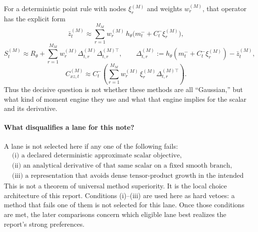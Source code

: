 \documentclass[11pt]{article}
\numberwithin{equation}{section}
\begin{document}
For a deterministic point rule with nodes \(\xi_r^{(M)}\) and weights
\(w_r^{(M)}\), that operator has the explicit form
\begin{equation}
  \bar z_t^{(M)}
  \approx
  \sum_{r=1}^{M_M} w_r^{(M)}
  \,h_\theta\!\bigl(m_t^-+C_t^-\xi_r^{(M)}\bigr),
  \label{eq:p32-selection-zbar}
\end{equation}
\begin{equation}
  S_t^{(M)}
  \approx
  R_\theta+
  \sum_{r=1}^{M_M} w_r^{(M)}
  \Delta_{t,r}^{(M)}\Delta_{t,r}^{(M)\top},
  \qquad
  \Delta_{t,r}^{(M)}:=h_\theta(m_t^-+C_t^-\xi_r^{(M)})-\bar z_t^{(M)},
  \label{eq:p32-selection-S}
\end{equation}
\begin{equation}
  C_{xz,t}^{(M)}
  \approx
  C_t^-\!\left(
  \sum_{r=1}^{M_M} w_r^{(M)}\,
  \xi_r^{(M)}\Delta_{t,r}^{(M)\top}
  \right).
  \label{eq:p32-selection-Cxz}
\end{equation}
Thus the decisive question is not whether these methods are all “Gaussian,” but
what kind of moment engine they use and what that engine implies for the scalar
and its derivative.

\paragraph{What disqualifies a lane for this note?}
A lane is not selected here if any one of the following fails:
\begin{equation}
\begin{aligned}
  &\text{(i) a declared deterministic approximate scalar objective,}\\
  &\text{(ii) an analytical derivative of that same scalar on a fixed smooth branch,}\\
  &\text{(iii) a representation that avoids dense tensor-product growth in the intended regime.}
\end{aligned}
  \label{eq:p32-selection-three-conditions}
\end{equation}
This is not a theorem of universal method superiority.  It is the local choice
architecture of this report.  Conditions (i)--(iii) are used here as hard vetoes:
a method that fails one of them is not selected for this lane.  Once those
conditions are met, the later comparisons concern which eligible lane best
realizes the report's strong preferences.
\end{document}
